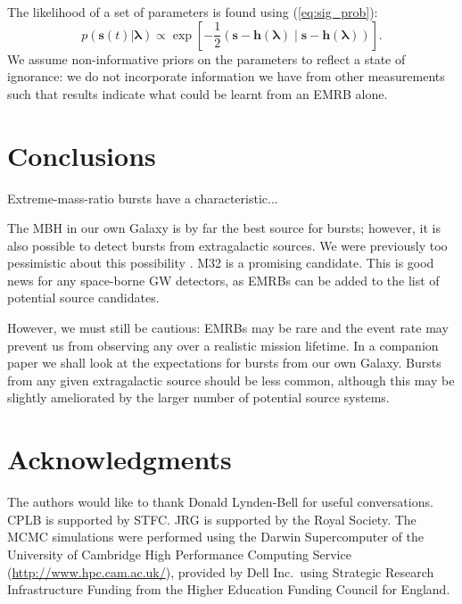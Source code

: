 \documentclass[useAMS,usedcolumn,usegraphicx,usenatbib]{mn2e}
\newcommand{\eqnref}[1]{(\ref{eq:#1})}
\newcommand{\recip}[1]{\ensuremath{\frac{1}{#1}}}
\newcommand{\innerprod}[2]{\ensuremath{\left({#1}\middle|{#2}\right)}}
\begin{document}
The likelihood of a set of parameters is found using \eqnref{sig_prob}:
\begin{equation}
p(\boldsymbol{s}(t)|\boldsymbol{\lambda}) \propto \exp\left[-\recip{2}\innerprod{\boldsymbol{s}-\boldsymbol{h}(\boldsymbol{\lambda})}{\boldsymbol{s}-\boldsymbol{h}(\boldsymbol{\lambda})}\right].
\label{eq:likelihood}
\end{equation}
We assume non-informative priors on the parameters to reflect a state of ignorance: we do not incorporate information we have from other measurements such that results indicate what could be learnt from an EMRB alone.

\section{Conclusions}

Extreme-mass-ratio bursts have a characteristic...

The MBH in our own Galaxy is by far the best source for bursts; however, it is also possible to detect bursts from extragalactic sources. We were previously too pessimistic about this possibility \citep{Berry2013}. M32 is a promising candidate. This is good news for any space-borne GW detectors, as EMRBs can be added to the list of potential source candidates.

However, we must still be cautious: EMRBs may be rare and the event rate may prevent us from observing any over a realistic mission lifetime. In a companion paper we shall look at the expectations for bursts from our own Galaxy. Bursts from any given extragalactic source should be less common, although this may be slightly ameliorated by the larger number of potential source systems.

\section*{Acknowledgments}

The authors would like to thank Donald Lynden-Bell for useful conversations. CPLB is supported by STFC. JRG is supported by the Royal Society. The MCMC simulations were performed using the Darwin Supercomputer of the University of Cambridge High Performance Computing Service (\url{http://www.hpc.cam.ac.uk/}), provided by Dell Inc.\ using Strategic Research Infrastructure Funding from the Higher Education Funding Council for England.




\bsp

\label{lastpage}
\end{document}
